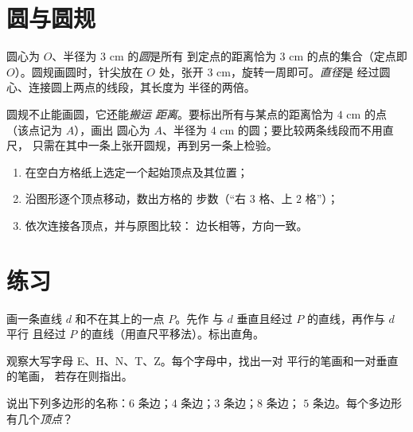 \section{圆与圆规}

\begin{definition}[圆]\label{def:g4:geometry:circle}
圆心为 $O$、半径为 $3$ cm 的\emph{圆}是所有
到定点的距离恰为 $3$ cm 的点的集合（定点即 $O$）。圆规画圆时，针尖放在
$O$ 处，张开 $3$ cm，旋转一周即可。\emph{直径}是
经过圆心、连接圆上两点的线段，其长度为
半径的两倍。
\end{definition}

\begin{example}[圆规：保持距离的工具]\label{ex:g4:geometry:compass}
圆规不止能画圆，它还能\emph{搬运
距离}。要标出所有与某点的距离恰为 $4$ cm 的点（该点记为 $A$），画出
圆心为 $A$、半径为 $4$ cm 的圆；要比较两条线段而不用直尺，
只需在其中一条上张开圆规，再到另一条上检验。
\end{example}

\begin{method}[在方格纸上复制图形]\label{met:g4:geometry:reproduce}
\begin{enumerate}
  \item 在空白方格纸上选定一个起始顶点及其位置；
  \item 沿图形逐个顶点移动，数出方格的
        步数（“右 $3$ 格、上 $2$ 格”）；
  \item 依次连接各顶点，并与原图比较：
        边长相等，方向一致。
\end{enumerate}
\end{method}

\section{练习}

\begin{exercise}[$\star$]\label{exo:g4:geometry:1}
画一条直线 $d$ 和不在其上的一点 $P$。先作
与 $d$ 垂直且经过 $P$ 的直线，再作与 $d$ 平行
且经过 $P$ 的直线（用直尺平移法）。标出直角。
\end{exercise}

\begin{exercise}[$\star$]\label{exo:g4:geometry:2}
观察大写字母 E、H、N、T、Z。每个字母中，找出一对
平行的笔画和一对垂直的笔画，
若存在则指出。
\end{exercise}

\begin{exercise}[$\star$]\label{exo:g4:geometry:3}
说出下列多边形的名称：$6$ 条边；$4$ 条边；$3$ 条边；$8$ 条边；
$5$ 条边。每个多边形有几个\emph{顶点}？
\end{exercise}

